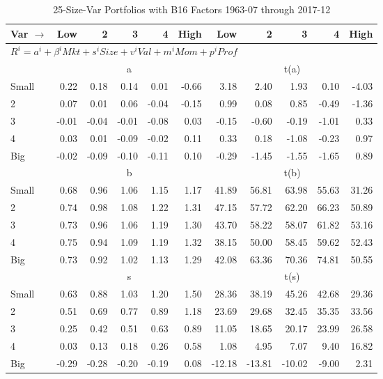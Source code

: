 
\begin{table}[!ht]
\footnotesize
\centering
\caption{25-Size-Var Portfolios with B16 Factors 1963-07 through 2017-12}
\begin{tabular}{lrrrrrrrrrr}
  \toprule
    
    Var $\rightarrow$ & Low & 2 & 3 & 4 & High & Low & 2 & 3 & 4 & High  \\ 
  \midrule
  \multicolumn{11}{l}{$R^i=a^i+\beta^iMkt+s^iSize+v^iVal+m^iMom+p^iProf$}  \\
  
     & \multicolumn{5}{c}{a} & \multicolumn{5}{c}{t(a)}   \\
     \cmidrule(r){2-6} \cmidrule(r){7-11} 
    Small  & 0.22  & 0.18  & 0.14  & 0.01  & -0.66  & 3.18  & 2.40  & 1.93  & 0.10  & -4.03   \\
    2  & 0.07  & 0.01  & 0.06  & -0.04  & -0.15  & 0.99  & 0.08  & 0.85  & -0.49  & -1.36   \\
    3  & -0.01  & -0.04  & -0.01  & -0.08  & 0.03  & -0.15  & -0.60  & -0.19  & -1.01  & 0.33   \\
    4  & 0.03  & 0.01  & -0.09  & -0.02  & 0.11  & 0.33  & 0.18  & -1.08  & -0.23  & 0.97   \\
    Big  & -0.02  & -0.09  & -0.10  & -0.11  & 0.10  & -0.29  & -1.45  & -1.55  & -1.65  & 0.89   \\
    
  
     & \multicolumn{5}{c}{b} & \multicolumn{5}{c}{t(b)}   \\
     \cmidrule(r){2-6} \cmidrule(r){7-11} 
    Small  & 0.68  & 0.96  & 1.06  & 1.15  & 1.17  & 41.89  & 56.81  & 63.98  & 55.63  & 31.26   \\
    2  & 0.74  & 0.98  & 1.08  & 1.22  & 1.31  & 47.15  & 57.72  & 62.20  & 66.23  & 50.89   \\
    3  & 0.73  & 0.96  & 1.06  & 1.19  & 1.30  & 43.70  & 58.22  & 58.07  & 61.82  & 53.16   \\
    4  & 0.75  & 0.94  & 1.09  & 1.19  & 1.32  & 38.15  & 50.00  & 58.45  & 59.62  & 52.43   \\
    Big  & 0.73  & 0.92  & 1.02  & 1.13  & 1.29  & 42.08  & 63.36  & 70.36  & 74.81  & 50.55   \\
    
  
     & \multicolumn{5}{c}{s} & \multicolumn{5}{c}{t(s)}   \\
     \cmidrule(r){2-6} \cmidrule(r){7-11} 
    Small  & 0.63  & 0.88  & 1.03  & 1.20  & 1.50  & 28.36  & 38.19  & 45.26  & 42.68  & 29.36   \\
    2  & 0.51  & 0.69  & 0.77  & 0.89  & 1.18  & 23.69  & 29.68  & 32.45  & 35.35  & 33.56   \\
    3  & 0.25  & 0.42  & 0.51  & 0.63  & 0.89  & 11.05  & 18.65  & 20.17  & 23.99  & 26.58   \\
    4  & 0.03  & 0.13  & 0.18  & 0.26  & 0.58  & 1.08  & 4.95  & 7.07  & 9.40  & 16.82   \\
    Big  & -0.29  & -0.28  & -0.20  & -0.19  & 0.08  & -12.18  & -13.81  & -10.02  & -9.00  & 2.31   \\
    

\end{tabular}
\end{table}
